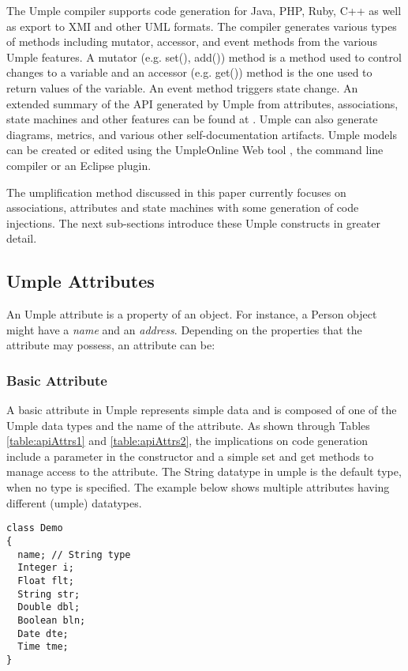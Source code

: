 The Umple compiler supports code generation for Java, PHP, Ruby, C++ as well as export to XMI and other UML formats. The compiler generates various types of methods including mutator, accessor, and event methods from the various Umple features. A mutator (e.g. set(), add()) method is a method used to control changes to a variable and an accessor (e.g. get()) method is the one used to return values of the variable. An event method triggers state change. An extended summary of the API generated by Umple from attributes, associations, state machines and other features can be found at \cite{UmpleAPI}. Umple can also generate diagrams, metrics, and various other self-documentation artifacts. Umple models can be created or edited using the UmpleOnline Web tool \cite{UmpleOnline}, the command line compiler or an Eclipse plugin. 

The umplification method discussed in this paper currently focuses on associations,  attributes and state machines with some generation of code injections. The next sub-sections introduce these Umple constructs in greater detail.

\subsection{Umple Attributes}
An Umple attribute is a property of an object. For instance, 
a Person object might have a \textit{name} and an \textit{address}. 
Depending on the properties that the attribute may possess, an attribute can be:
\subsubsection{Basic Attribute}
A basic attribute in Umple represents simple data and is composed of one of the Umple data types and the name of the attribute. As shown through Tables \ref{table:apiAttrs1} and \ref{table:apiAttrs2}, the implications on code generation include a parameter in the constructor and a simple set and get methods to manage access to the attribute. The String datatype in umple is the default type, when no type is specified. 	The example below shows multiple attributes having different (umple) datatypes.

\vspace{\baselineskip}
\begin{lstlisting}[style=umplePlain]
class Demo 
{
  name; // String type
  Integer i;
  Float flt;
  String str;  
  Double dbl;
  Boolean bln;
  Date dte; 
  Time tme;
}
\end{lstlisting}

